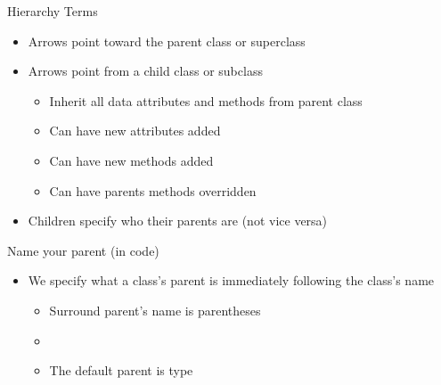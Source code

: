 \documentclass[pdf, aspectratio=169, 12pt]{beamer}
\begin{document}
\begin{frame}{Hierarchy Terms}
	\begin{itemize}
		\item Arrows point toward the \alert{parent class} or superclass
		\item Arrows point from a \alert{child class} or subclass
			\begin{itemize}
				\item \alert{Inherit} all data attributes and methods from parent class
				\item Can have new attributes added
				\item Can have new methods added
				\item Can have parents methods overridden
			\end{itemize}
		\item Children specify who their parents are (not vice versa)
	\end{itemize}
\end{frame}

\begin{frame}{Name your parent (in code)}
	\begin{itemize}
		\item We specify what a class's parent is immediately following the class's name
			\begin{itemize}
				\item Surround parent's name is parentheses
				\item {}
				\item The default parent is type 
			\end{itemize}
	\end{itemize}
\end{frame}
\end{document}
